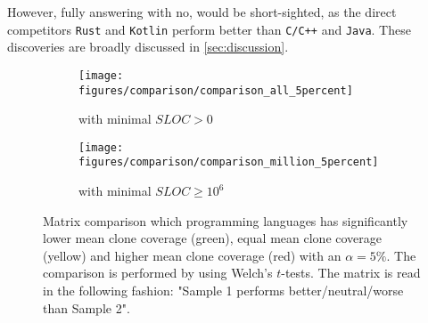 However, fully answering  with no, would be short-sighted, as the direct competitors \texttt{Rust} and \texttt{Kotlin} perform better than \texttt{C/C++} and \texttt{Java}. These discoveries are broadly discussed in \autoref{sec:discussion}.

\begin{figure}[tbh!]
	\centering
	\begin{subfigure}[t]{0.49\textwidth}
		\texttt{[image: figures/comparison/comparison\_all\_5percent]}
		\caption{with minimal $SLOC > 0$}
		\label{fig:matrix_comp_all}
	\end{subfigure}
	\hfill
	\begin{subfigure}[t]{0.49\textwidth}
		\texttt{[image: figures/comparison/comparison\_million\_5percent]}
		\caption{with minimal $SLOC \geq 10^{6}$}
		\label{fig:matrix_comp_million}
	\end{subfigure}
	\caption{Matrix comparison which programming languages has significantly lower mean clone coverage (green), equal mean clone coverage (yellow) and higher mean clone coverage (red) with an $\alpha=5\%$. The comparison is performed by using Welch's $t$-tests. The matrix is read in the following fashion: "Sample 1 performs better/neutral/worse than Sample 2".}
	\label{fig:matrix_comp}
\end{figure}

